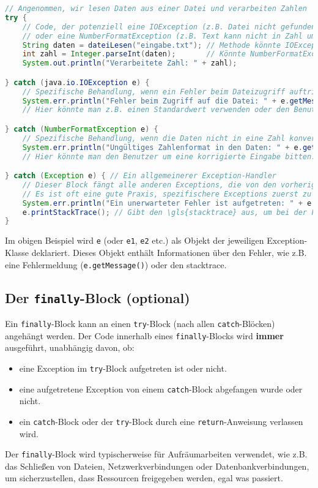 \begin{lstlisting}[language=Java, caption={Beispiel für catch-Blöcke}, label=lst:catchblock_beispiel_java]
// Angenommen, wir lesen Daten aus einer Datei und verarbeiten Zahlen
try {
    // Code, der potenziell eine IOException (z.B. Datei nicht gefunden)
    // oder eine NumberFormatException (z.B. Text kann nicht in Zahl umgewandelt werden) auslösen könnte.
    String daten = dateiLesen("eingabe.txt"); // Methode könnte IOException werfen
    int zahl = Integer.parseInt(daten);       // Könnte NumberFormatException werfen
    System.out.println("Verarbeitete Zahl: " + zahl);

} catch (java.io.IOException e) {
    // Spezifische Behandlung, wenn ein Fehler beim Dateizugriff auftritt
    System.err.println("Fehler beim Zugriff auf die Datei: " + e.getMessage());
    // Hier könnte man z.B. einen Standardwert verwenden oder den Benutzer informieren.

} catch (NumberFormatException e) {
    // Spezifische Behandlung, wenn die Daten nicht in eine Zahl konvertiert werden können
    System.err.println("Ungültiges Zahlenformat in den Daten: " + e.getMessage());
    // Hier könnte man den Benutzer um eine korrigierte Eingabe bitten.

} catch (Exception e) { // Ein allgemeinerer Exception-Handler
    // Dieser Block fängt alle anderen Exceptions, die von den vorherigen catch-Blöcken nicht abgefangen wurden.
    // Es ist oft eine gute Praxis, spezifischere Exceptions zuerst zu fangen.
    System.err.println("Ein unerwarteter Fehler ist aufgetreten: " + e.getMessage());
    e.printStackTrace(); // Gibt den \gls{stacktrace} aus, um bei der Fehlersuche zu helfen.
}
\end{lstlisting}
Im obigen Beispiel wird \texttt{e} (oder \texttt{e1}, \texttt{e2} etc.) als Objekt der jeweiligen Exception-Klasse deklariert. Dieses Objekt enthält Informationen über den Fehler, wie z.B. eine Fehlermeldung (\texttt{e.getMessage()}) oder den \gls{stacktrace}.

\subsection{Der \texttt{finally}-Block (optional)}

Ein \texttt{finally}-Block kann an einen \texttt{try}-Block (nach allen \texttt{catch}-Blöcken) angehängt werden. Der Code innerhalb eines \texttt{finally}-Blocks wird \textbf{immer} ausgeführt, unabhängig davon, ob:
\begin{itemize}
    \item eine Exception im \texttt{try}-Block aufgetreten ist oder nicht.
    \item eine aufgetretene Exception von einem \texttt{catch}-Block abgefangen wurde oder nicht.
    \item ein \texttt{catch}-Block oder der \texttt{try}-Block durch eine \texttt{return}-Anweisung verlassen wird.
\end{itemize}
Der \texttt{finally}-Block wird typischerweise für Aufräumarbeiten verwendet, wie z.B. das Schließen von Dateien, Netzwerkverbindungen oder Datenbankverbindungen, um sicherzustellen, dass Ressourcen freigegeben werden, egal was passiert.

